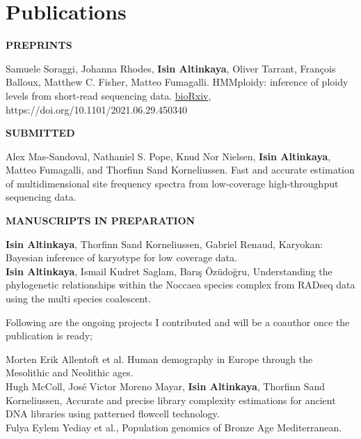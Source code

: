 \documentclass[letterpaper,10.5pt]{article}
\begin{document}
\section{Publications}
\textbf{PREPRINTS} \\
\medskip

Samuele Soraggi, Johanna Rhodes, \textbf{Isin Altinkaya}, Oliver Tarrant, François Balloux, Matthew C. Fisher, Matteo Fumagalli. HMMploidy: inference of ploidy levels from short-read sequencing data. \href{https://www.biorxiv.org/content/10.1101/2021.06.29.450340v1}{bioRxiv}, https://doi.org/10.1101/2021.06.29.450340 \\
\medskip

\textbf{SUBMITTED} \\
\medskip


Alex Mas-Sandoval, Nathaniel S. Pope, Knud Nor Nielsen, \textbf{Isin Altinkaya}, Matteo Fumagalli, and Thorfinn Sand Korneliussen. Fast and accurate estimation of multidimensional site frequency spectra from low-coverage high-throughput sequencing data.  \\

\medskip

\textbf{MANUSCRIPTS IN PREPARATION} \\
\medskip


\textbf{Isin Altinkaya}, Thorfinn Sand Korneliussen, Gabriel Renaud, Karyokan: Bayesian inference of karyotype for low coverage data. \\


\textbf{Isin Altinkaya}, Ismail Kudret Saglam, Bar{\i}\c{s} \"{O}z\"{u}do\u{g}ru, Understanding the phylogenetic relationships within the Noccaea species complex from RADseq data using the multi species coalescent. \\

\medskip

Following are the ongoing projects I contributed and will be a coauthor once the publication is ready;
\medskip

Morten Erik Allentoft et al. Human demography in Europe through the Mesolithic and Neolithic ages. \\ 


Hugh McColl, José Victor Moreno Mayar, \textbf{Isin Altinkaya}, Thorfinn Sand Korneliussen, Accurate and precise library complexity estimations for ancient DNA libraries using patterned flowcell technology. \\

Fulya Eylem Yediay et al., Population genomics of Bronze Age Mediterranean. \\
\end{document}
